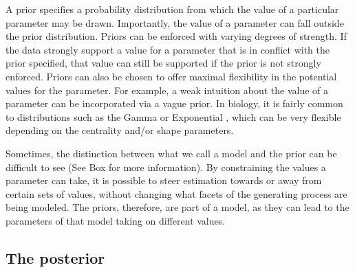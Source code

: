 
A prior specifies a probability distribution from which the value of a particular parameter may be drawn.
Importantly, the value of a parameter can fall outside the prior distribution.
Priors can be enforced with varying degrees of strength.
If the data strongly support a value for a parameter that is in conflict with the prior specified, that value can still be supported if the prior is not strongly enforced.
Priors can also be chosen to offer maximal flexibility in the potential values for the parameter.
For example, a weak intuition about the value of a parameter can be incorporated via a vague prior.
In biology, it is fairly common to  distributions such as the Gamma or Exponential , which can be very flexible depending on the centrality and/or shape parameters.

Sometimes, the distinction between what we call a model and the prior can be difficult to see (See Box  for more information).
By constraining the values a parameter can take, it is possible to steer estimation towards or away from certain sets of values, without changing what facets of the generating process are being modeled.
The priors, therefore, are part of a model, as they can lead to the parameters of that model taking on different values.

\subsection{The posterior}

